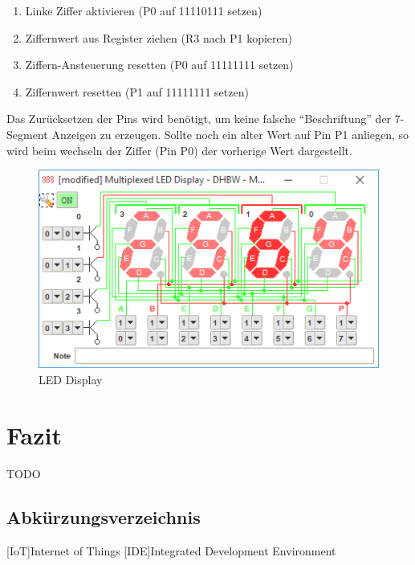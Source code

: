 \documentclass[11pt,ngerman]{report}
\begin{document}
\begin{enumerate}
	\item Linke Ziffer aktivieren (P0 auf 11110111 setzen)
	\item Ziffernwert aus Register ziehen (R3 nach P1 kopieren)
	\item Ziffern-Ansteuerung resetten (P0 auf 11111111 setzen)
	\item Ziffernwert resetten (P1 auf 11111111 setzen)
\end{enumerate}

Das Zurücksetzen der Pins wird benötigt, um keine falsche “Beschriftung” der 7-Segment Anzeigen zu erzeugen. Sollte noch ein alter Wert auf Pin P1 anliegen, so wird beim wechseln der Ziffer (Pin P0) der vorherige Wert dargestellt. 

\begin{figure}[h]
	\caption{LED Display}
	\centering
	\includegraphics[width=\textwidth]{leddisplay.png}
\end{figure}


\chapter{Fazit}

TODO


\newpage

\section*{Abkürzungsverzeichnis}

\begin{acronym}
	[IoT]{Internet of Things}
	[IDE]{Integrated Development Environment}
\end{acronym}
\end{document}
